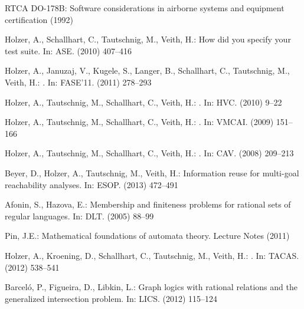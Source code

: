 \documentclass[envcountsame]{llncs}
\begin{document}

\begin{thebibliography}{10}

{RTCA DO-178B}:
\newblock Software considerations in airborne systems and equipment
  certification (1992)

Holzer, A., Schallhart, C., Tautschnig, M., Veith, H.:
\newblock How did you specify your test suite.
\newblock In: ASE. (2010)  407--416

Holzer, A., Januzaj, V., Kugele, S., Langer, B., Schallhart, C., Tautschnig,
  M., Veith, H.:
.
\newblock In: {FASE'11}. (2011)  278--293

Holzer, A., Tautschnig, M., Schallhart, C., Veith, H.:
.
\newblock In: {HVC}. (2010)  9--22

Holzer, A., Tautschnig, M., Schallhart, C., Veith, H.:
.
\newblock In: {VMCAI}. (2009)  151--166

Holzer, A., Tautschnig, M., Schallhart, C., Veith, H.:
.
\newblock In: {CAV}. (2008)  209--213

Beyer, D., Holzer, A., Tautschnig, M., Veith, H.:
\newblock Information reuse for multi-goal reachability analyses.
\newblock In: ESOP. (2013)  472--491

Afonin, S., Hazova, E.:
\newblock Membership and finiteness problems for rational sets of regular
  languages.
\newblock In: DLT. (2005)  88--99

Pin, J.E.:
\newblock Mathematical foundations of automata theory.
\newblock Lecture Notes (2011)

Holzer, A., Kroening, D., Schallhart, C., Tautschnig, M., Veith, H.:
.
\newblock In: {TACAS}. (2012)  538--541

Barcel{\'o}, P., Figueira, D., Libkin, L.:
\newblock Graph logics with rational relations and the generalized intersection
  problem.
\newblock In: LICS. (2012)  115--124


\end{thebibliography}
\end{document}
